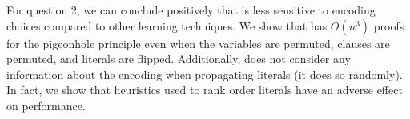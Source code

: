For question 2, we can conclude positively that \tool is less sensitive to
encoding choices compared to other \pr learning techniques. We show that \tool
has $O(n^3)$ proofs for the pigeonhole principle even when the variables are
permuted, clauses are permuted, and literals are flipped. Additionally, \tool
does not consider any information about the encoding when propagating literals
(it does so randomly). In fact, we show that heuristics used to rank order
literals have an adverse effect on performance.